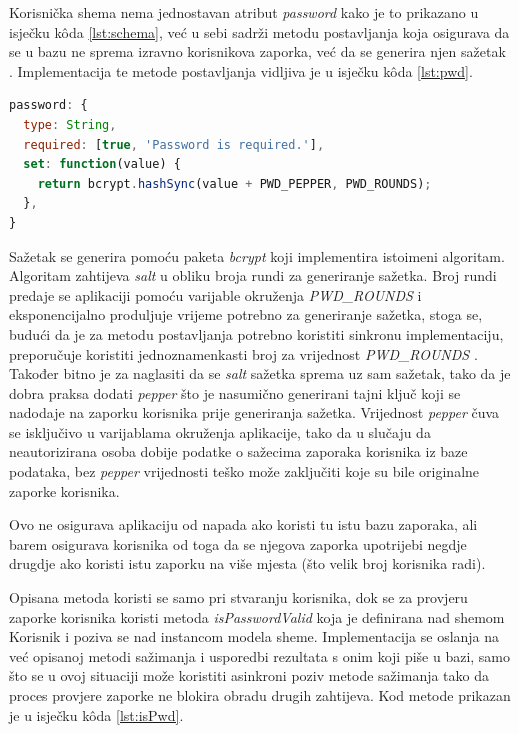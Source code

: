 \documentclass[times, utf8, diplomski, numeric]{fer}
\newcommand{\razmakp}{\vspace{18pt}}
\newcommand{\razmaks}{\vspace{10pt}}
\begin{document}
Korisnička shema nema jednostavan atribut \emph{password} kako je to prikazano u isječku kôda \ref{lst:schema}, već u sebi sadrži metodu postavljanja  koja osigurava da se u bazu ne sprema izravno korisnikova zaporka, već da se generira njen sažetak .
Implementacija te metode postavljanja vidljiva je u isječku kôda \ref{lst:pwd}.

\razmakp %
\begin{lstlisting}[language=JavaScript, caption={Attribut \emph{password} od sheme Korisnik}, label={lst:pwd}]
password: {
  type: String,
  required: [true, 'Password is required.'],
  set: function(value) {
    return bcrypt.hashSync(value + PWD_PEPPER, PWD_ROUNDS);
  },
}
\end{lstlisting}
\razmaks

Sažetak se generira pomoću paketa \emph{bcrypt} koji implementira istoimeni algoritam.
Algoritam zahtijeva \emph{salt} u obliku broja rundi za generiranje sažetka.
Broj rundi predaje se aplikaciji pomoću varijable okruženja \emph{PWD\_ROUNDS} i eksponencijalno produljuje vrijeme potrebno za generiranje sažetka, stoga se, budući da je za metodu postavljanja potrebno koristiti sinkronu implementaciju, preporučuje koristiti jednoznamenkasti broj za vrijednost \emph{PWD\_ROUNDS} \citep{bcrypt}.
Također bitno je za naglasiti da se \emph{salt} sažetka sprema uz sam sažetak, tako da je dobra praksa dodati \emph{pepper} što je nasumično generirani tajni ključ koji se nadodaje na zaporku korisnika prije generiranja sažetka.
Vrijednost \emph{pepper} čuva se isključivo u varijablama okruženja aplikacije, tako da u slučaju da neautorizirana osoba dobije podatke o sažecima zaporaka korisnika iz baze podataka, bez \emph{pepper} vrijednosti teško može zaključiti koje su bile originalne zaporke korisnika.

Ovo ne osigurava aplikaciju od napada ako koristi tu istu bazu zaporaka, ali barem osigurava korisnika od toga da se njegova zaporka upotrijebi negdje drugdje ako koristi istu zaporku na više mjesta (što velik broj korisnika radi).

\razmakp

Opisana metoda koristi se samo pri stvaranju korisnika, dok se za provjeru zaporke korisnika koristi metoda \emph{isPasswordValid} koja je definirana nad shemom Korisnik i poziva se nad instancom modela sheme.
Implementacija se oslanja na već opisanoj metodi sažimanja i usporedbi rezultata s onim koji piše u bazi, samo što se u ovoj situaciji može koristiti asinkroni poziv metode sažimanja tako da proces provjere zaporke ne blokira obradu drugih zahtijeva.
Kod metode prikazan je u isječku kôda \ref{lst:isPwd}.
\end{document}
